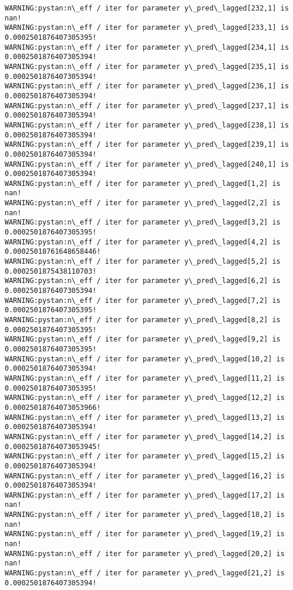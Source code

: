 \documentclass[11pt]{article}
\begin{document}
\begin{Verbatim}[commandchars=\\\{\}]
WARNING:pystan:n\_eff / iter for parameter y\_pred\_lagged[232,1] is nan!
WARNING:pystan:n\_eff / iter for parameter y\_pred\_lagged[233,1] is 0.0002501876407305395!
WARNING:pystan:n\_eff / iter for parameter y\_pred\_lagged[234,1] is 0.0002501876407305394!
WARNING:pystan:n\_eff / iter for parameter y\_pred\_lagged[235,1] is 0.0002501876407305394!
WARNING:pystan:n\_eff / iter for parameter y\_pred\_lagged[236,1] is 0.0002501876407305394!
WARNING:pystan:n\_eff / iter for parameter y\_pred\_lagged[237,1] is 0.0002501876407305394!
WARNING:pystan:n\_eff / iter for parameter y\_pred\_lagged[238,1] is 0.0002501876407305394!
WARNING:pystan:n\_eff / iter for parameter y\_pred\_lagged[239,1] is 0.0002501876407305394!
WARNING:pystan:n\_eff / iter for parameter y\_pred\_lagged[240,1] is 0.0002501876407305394!
WARNING:pystan:n\_eff / iter for parameter y\_pred\_lagged[1,2] is nan!
WARNING:pystan:n\_eff / iter for parameter y\_pred\_lagged[2,2] is nan!
WARNING:pystan:n\_eff / iter for parameter y\_pred\_lagged[3,2] is 0.0002501876407305395!
WARNING:pystan:n\_eff / iter for parameter y\_pred\_lagged[4,2] is 0.00025018761648658446!
WARNING:pystan:n\_eff / iter for parameter y\_pred\_lagged[5,2] is 0.0002501875438110703!
WARNING:pystan:n\_eff / iter for parameter y\_pred\_lagged[6,2] is 0.0002501876407305394!
WARNING:pystan:n\_eff / iter for parameter y\_pred\_lagged[7,2] is 0.0002501876407305395!
WARNING:pystan:n\_eff / iter for parameter y\_pred\_lagged[8,2] is 0.0002501876407305395!
WARNING:pystan:n\_eff / iter for parameter y\_pred\_lagged[9,2] is 0.0002501876407305395!
WARNING:pystan:n\_eff / iter for parameter y\_pred\_lagged[10,2] is 0.0002501876407305394!
WARNING:pystan:n\_eff / iter for parameter y\_pred\_lagged[11,2] is 0.0002501876407305395!
WARNING:pystan:n\_eff / iter for parameter y\_pred\_lagged[12,2] is 0.00025018764073053966!
WARNING:pystan:n\_eff / iter for parameter y\_pred\_lagged[13,2] is 0.0002501876407305394!
WARNING:pystan:n\_eff / iter for parameter y\_pred\_lagged[14,2] is 0.00025018764073053945!
WARNING:pystan:n\_eff / iter for parameter y\_pred\_lagged[15,2] is 0.0002501876407305394!
WARNING:pystan:n\_eff / iter for parameter y\_pred\_lagged[16,2] is 0.0002501876407305394!
WARNING:pystan:n\_eff / iter for parameter y\_pred\_lagged[17,2] is nan!
WARNING:pystan:n\_eff / iter for parameter y\_pred\_lagged[18,2] is nan!
WARNING:pystan:n\_eff / iter for parameter y\_pred\_lagged[19,2] is nan!
WARNING:pystan:n\_eff / iter for parameter y\_pred\_lagged[20,2] is nan!
WARNING:pystan:n\_eff / iter for parameter y\_pred\_lagged[21,2] is 0.0002501876407305394!

\end{Verbatim}
\end{document}
